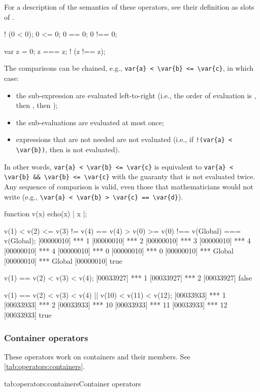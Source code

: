 For a description of the semantics of these operators, see their definition
as slots of .

\begin{urbiassert}
 ! (0 <  0);
    0 <= 0;
    0 == 0;
   0 !== 0;

var z = 0;
     z === z;
  ! (z !== z);
\end{urbiassert}

The comparisons can be chained, e.g.,
\lstinline|var{a} < \var{b} <= \var{c}|, in which case:
\begin{itemize}
\item the sub-expression are evaluated left-to-right (i.e., the order of
  evaluation is , then , then );
\item the sub-evaluations are evaluated at most once;
\item expressions that are not needed are not evaluated (i.e., if
  \lstinline|!(var{a} < \var{b})|, then  is not evaluated).
\end{itemize}

In other words, \lstinline|var{a} < \var{b} <= \var{c}| is equivalent to
\lstinline|var{a} < \var{b} && \var{b} <= \var{c}| with the guaranty that
 is not evaluated twice.  Any sequence of comparison is valid, even
those that mathematicians would not write (e.g.,
\lstinline|\var{a} < \var{b} > \var{c} == \var{d}|).

\begin{urbiscript}
function v(x) { echo(x) | x }|;

v(1) < v(2) <= v(3) != v(4) == v(4) > v(0) >= v(0) !== v(Global) === v(Global);
[00000010] *** 1
[00000010] *** 2
[00000010] *** 3
[00000010] *** 4
[00000010] *** 4
[00000010] *** 0
[00000010] *** 0
[00000010] *** Global
[00000010] *** Global
[00000010] true

v(1) == v(2) < v(3) < v(4);
[00033927] *** 1
[00033927] *** 2
[00033927] false

v(1) == v(2) < v(3) < v(4) || v(10) < v(11) < v(12);
[00033933] *** 1
[00033933] *** 2
[00033933] *** 10
[00033933] *** 11
[00033933] *** 12
[00033933] true
\end{urbiscript}

\subsubsection{Container operators}
\label{sec:lang:op:containers}

These operators work on containers and their members. See
\autoref{tab:operators:containers}.
\begin{operatorTable}{tab:operators:containers}{Container operators}
  \operatorsub\\\operatorsubass
  \\\hline
  \operatorin\\\operatornotin
\end{operatorTable}

